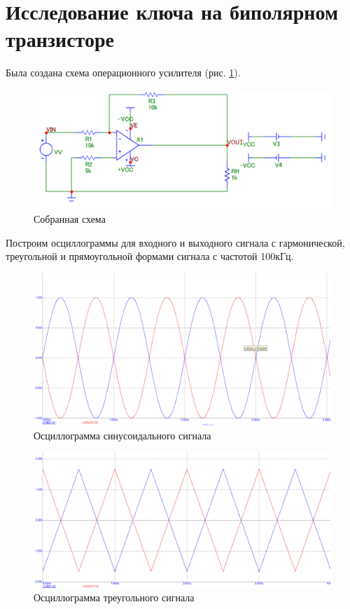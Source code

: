 \documentclass[a4paper,14pt]{article}
\begin{document}

\pagebreak
\section{Исследование ключа на биполярном транзисторе}

Была создана схема операционного усилителя (рис. \ref{fig:shop}).

\begin{figure}[H]
	\centering
	\includegraphics[width=0.9\linewidth]{image/sh_op}
	\caption{Собранная схема}
	\label{fig:shop}
\end{figure}

Построим осциллограммы для входного и выходного сигнала с гармонической, треугольной и прямоугольной формами сигнала с частотой 100кГц.

\begin{figure}[H]
	\centering
	\includegraphics[width=0.6\linewidth]{image/graf_1k_garm}
	\caption{Осциллограмма синусоидального сигнала}
	\label{fig:graf1kgarm}
\end{figure}

\begin{figure}[H]
	\centering
	\includegraphics[width=0.6\linewidth]{image/graf_1k_tre}
	\caption{Осциллограмма треугольного сигнала}
	\label{fig:graf1ktre}
\end{figure}
\end{document}
